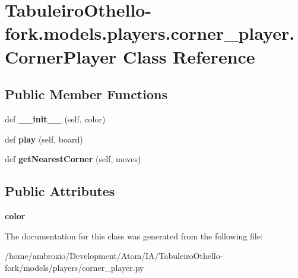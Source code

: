\hypertarget{class_tabuleiro_othello-fork_1_1models_1_1players_1_1corner__player_1_1_corner_player}{}\section{Tabuleiro\+Othello-\/fork.models.\+players.\+corner\+\_\+player.\+Corner\+Player Class Reference}
\label{class_tabuleiro_othello-fork_1_1models_1_1players_1_1corner__player_1_1_corner_player}
\subsection*{Public Member Functions}
\begin{DoxyCompactItemize}
\item 
\hypertarget{class_tabuleiro_othello-fork_1_1models_1_1players_1_1corner__player_1_1_corner_player_a4ea38100808df8a92727ff8e19449523}{}def {\bfseries \+\_\+\+\_\+init\+\_\+\+\_\+} (self, color)\label{class_tabuleiro_othello-fork_1_1models_1_1players_1_1corner__player_1_1_corner_player_a4ea38100808df8a92727ff8e19449523}

\item 
\hypertarget{class_tabuleiro_othello-fork_1_1models_1_1players_1_1corner__player_1_1_corner_player_ae2a5fafa38f2e5ff78513041de677c8a}{}def {\bfseries play} (self, board)\label{class_tabuleiro_othello-fork_1_1models_1_1players_1_1corner__player_1_1_corner_player_ae2a5fafa38f2e5ff78513041de677c8a}

\item 
\hypertarget{class_tabuleiro_othello-fork_1_1models_1_1players_1_1corner__player_1_1_corner_player_a2cfc7e0871e38df3d5405776bd33625a}{}def {\bfseries get\+Nearest\+Corner} (self, moves)\label{class_tabuleiro_othello-fork_1_1models_1_1players_1_1corner__player_1_1_corner_player_a2cfc7e0871e38df3d5405776bd33625a}

\end{DoxyCompactItemize}
\subsection*{Public Attributes}
\begin{DoxyCompactItemize}
\item 
\hypertarget{class_tabuleiro_othello-fork_1_1models_1_1players_1_1corner__player_1_1_corner_player_a2bb48d79b041a4a8ae13159c549213c6}{}{\bfseries color}\label{class_tabuleiro_othello-fork_1_1models_1_1players_1_1corner__player_1_1_corner_player_a2bb48d79b041a4a8ae13159c549213c6}

\end{DoxyCompactItemize}


The documentation for this class was generated from the following file\+:\begin{DoxyCompactItemize}
\item 
/home/ambrozio/\+Development/\+Atom/\+I\+A/\+Tabuleiro\+Othello-\/fork/models/players/corner\+\_\+player.\+py\end{DoxyCompactItemize}
